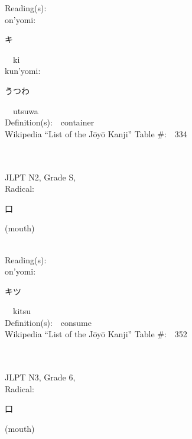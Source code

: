 \begin{multicols}{2}
Reading(s):\ \ \\
{\hspace*{1em}}on'yomi:\ \ \\
{\hspace*{2em}}{\begin{CJK}{UTF8}{min} キ \end{CJK}}\ \ ki\ \ \\
{\hspace*{1em}}kun'yomi:\ \ \\
{\hspace*{2em}}{\begin{CJK}{UTF8}{min} うつわ \end{CJK}}\ \ utsuwa\ \ \\
Definition(s):\ \ container \\
Wikipedia ``List of the J\=oy\=o Kanji'' Table \#:\ \ 334 \\
\ \ \\
{\fontsize{34pt}{40pt}  }\ \ \\  %
{JLPT N2, Grade S, \\Radical:\ \ {\begin{CJK}{UTF8}{min} 口 \end{CJK}} (mouth) } \\
Reading(s):\ \ \\
{\hspace*{1em}}on'yomi:\ \ \\
{\hspace*{2em}}{\begin{CJK}{UTF8}{min} キツ \end{CJK}}\ \ kitsu\ \ \\
Definition(s):\ \ consume \\
Wikipedia ``List of the J\=oy\=o Kanji'' Table \#:\ \ 352 \\
\ \ \\
{\fontsize{34pt}{40pt}  }\ \ \\  %
{JLPT N3, Grade 6, \\Radical:\ \ {\begin{CJK}{UTF8}{min} 口 \end{CJK}} (mouth) } \\

\end{multicols}
